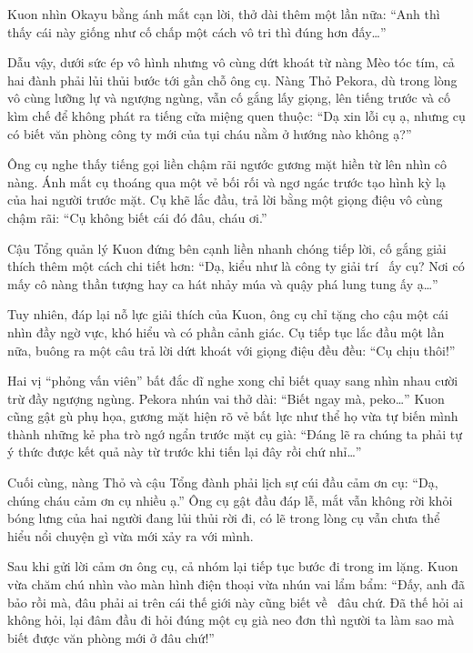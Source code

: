 \documentclass[../main.tex]{subfiles}
\begin{document}
Kuon nhìn Okayu bằng ánh mắt cạn lời, thở dài thêm một lần nữa: ``Anh thì thấy cái này giống như cố chấp một cách vô tri thì đúng hơn đấy\dots''

Dẫu vậy, dưới sức ép vô hình nhưng vô cùng dứt khoát từ nàng Mèo tóc tím, cả hai đành phải lủi thủi bước tới gần chỗ ông cụ. Nàng Thỏ Pekora, dù trong lòng vô cùng lưỡng lự và ngượng ngùng, vẫn cố gắng lấy giọng, lên tiếng trước và cố kìm chế để không phát ra tiếng cửa miệng quen thuộc: ``Dạ xin lỗi cụ ạ, nhưng cụ có biết văn phòng công ty mới của tụi cháu nằm ở hướng nào không ạ?''

Ông cụ nghe thấy tiếng gọi liền chậm rãi ngước gương mặt hiền từ lên nhìn cô nàng. Ánh mắt cụ thoáng qua một vẻ bối rối và ngơ ngác trước tạo hình kỳ lạ của hai người trước mặt. Cụ khẽ lắc đầu, trả lời bằng một giọng điệu vô cùng chậm rãi: ``Cụ không biết cái đó đâu, cháu ơi.''

Cậu Tổng quản lý Kuon đứng bên cạnh liền nhanh chóng tiếp lời, cố gắng giải thích thêm một cách chi tiết hơn: ``Dạ, kiểu như là công ty giải trí \hll\ ấy cụ? Nơi có mấy cô nàng thần tượng hay ca hát nhảy múa và quậy phá lung tung ấy ạ\dots''

Tuy nhiên, đáp lại nỗ lực giải thích của Kuon, ông cụ chỉ tặng cho cậu một cái nhìn đầy ngờ vực, khó hiểu và có phần cảnh giác. Cụ tiếp tục lắc đầu một lần nữa, buông ra một câu trả lời dứt khoát với giọng điệu đều đều: ``Cụ chịu thôi!''


Hai vị ``phỏng vấn viên'' bất đắc dĩ nghe xong chỉ biết quay sang nhìn nhau cười trừ đầy ngượng ngùng. Pekora nhún vai thở dài: ``Biết ngay mà, peko\dots'' Kuon cũng gật gù phụ họa, gương mặt hiện rõ vẻ bất lực như thể họ vừa tự biến mình thành những kẻ pha trò ngớ ngẩn trước mặt cụ già: ``Đáng lẽ ra chúng ta phải tự ý thức được kết quả này từ trước khi tiến lại đây rồi chứ nhỉ\dots''

Cuối cùng, nàng Thỏ và cậu Tổng đành phải lịch sự cúi đầu cảm ơn cụ: ``Dạ, chúng cháu cảm ơn cụ nhiều ạ.'' Ông cụ gật đầu đáp lễ, mắt vẫn không rời khỏi bóng lưng của hai người đang lủi thủi rời đi, có lẽ trong lòng cụ vẫn chưa thể hiểu nổi chuyện gì vừa mới xảy ra với mình.

\ct

Sau khi gửi lời cảm ơn ông cụ, cả nhóm lại tiếp tục bước đi trong im lặng. Kuon vừa chăm chú nhìn vào màn hình điện thoại vừa nhún vai lẩm bẩm: ``Đấy, anh đã bảo rồi mà, đâu phải ai trên cái thế giới này cũng biết về \hll\ đâu chứ. Đã thế hỏi ai không hỏi, lại đâm đầu đi hỏi đúng một cụ già neo đơn thì người ta làm sao mà biết được văn phòng mới ở đâu chứ!''
\end{document}
